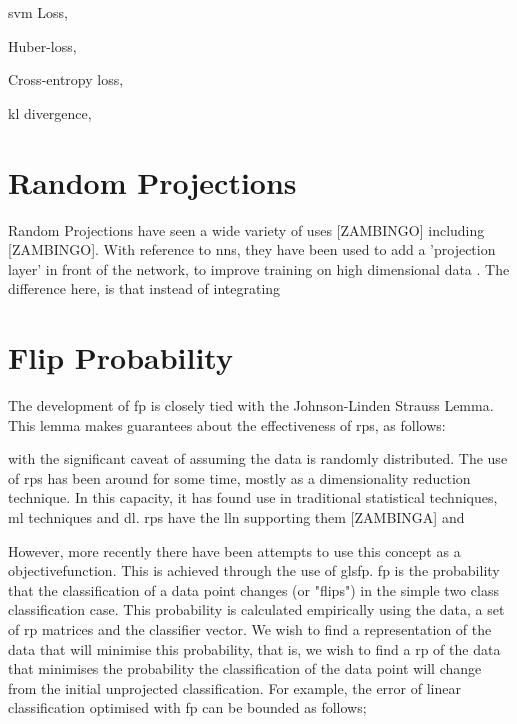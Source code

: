 \gls{svm} Loss,

Huber-loss,

Cross-entropy loss,

\gls{kl} divergence,

\section{Random Projections}

Random Projections have seen a wide variety of uses [ZAMBINGO] including [ZAMBINGO]. With reference to \gls{nn}s, they have been used to add a 'projection layer' in front of the network, to improve training on high dimensional data \cite{random_project_high_d}. The difference here, is that instead of integrating 

\section{Flip Probability}

The development of \gls{fp} is closely tied with the Johnson-Linden Strauss Lemma. This lemma makes guarantees about the effectiveness of \gls{rp}s, as follows:



with the significant caveat of assuming the data is randomly distributed. The use of \gls{rp}s has been around for some time, mostly as a dimensionality reduction technique. In this capacity, it has found use in traditional statistical techniques, \gls{ml} techniques and \gls{dl}. \gls{rp}s have the \gls{lln} supporting them [ZAMBINGA] and 

However, more recently there have been attempts to use this concept as a \gls{objectivefunction}. This is achieved through the use of gls{fp}. \gls{fp} is the probability that the classification of a data point changes (or "flips") in the simple two class classification case. This probability is calculated empirically using the data, a set of \gls{rp} matrices and the classifier vector. We wish to find a representation of the data that will minimise this probability, that is, we wish to find a \gls{rp} of the data that minimises the probability the classification of the data point will change from the initial unprojected classification.  For example, the error of linear classification optimised with \gls{fp} can be bounded as follows;

